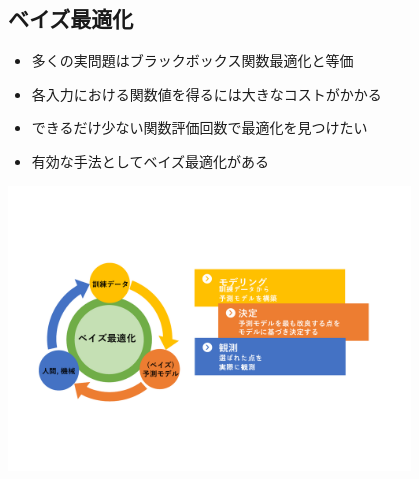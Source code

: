 \documentclass[dvipdfmx, 10.5pt]{beamer}
\begin{document}
\subsection{ベイズ最適化}
\begin{frame}{\insertsubsection}

	\begin{itemize}
		\item 多くの実問題はブラックボックス関数最適化と等価
		\item 各入力における関数値を得るには大きなコストがかかる
		\item できるだけ少ない関数評価回数で最適化を見つけたい
		\item 有効な手法として\alert{ベイズ最適化}がある
	\end{itemize}
	\vspace{10pt}
	\begin{center}
		\includegraphics[width=0.80\textwidth]{./Fig/BO.pdf}
	\end{center}

\end{frame}
\end{document}
